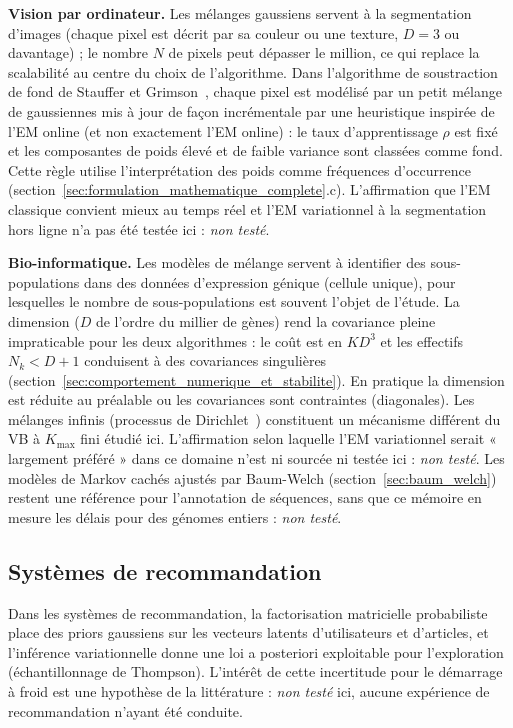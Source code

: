 \textbf{Vision par ordinateur. }Les mélanges gaussiens servent à la segmentation d'images (chaque pixel est décrit par sa couleur ou une texture, $D=3$ ou davantage) ; le nombre $N$ de pixels peut dépasser le million, ce qui replace la scalabilité au centre du choix de l'algorithme. Dans l'algorithme de soustraction de fond de Stauffer et Grimson~\cite{stauffer1999}, chaque pixel est modélisé par un petit mélange de gaussiennes mis à jour de façon incrémentale par une heuristique inspirée de l'EM online (et non exactement l'EM online) : le taux d'apprentissage $\rho$ est fixé et les composantes de poids élevé et de faible variance sont classées comme fond. Cette règle utilise l'interprétation des poids comme fréquences d'occurrence (section~\ref{sec:formulation_mathematique_complete}.c). L'affirmation que l'EM classique convient mieux au temps réel et l'EM variationnel à la segmentation hors ligne n'a pas été testée ici : \emph{non testé}.

\textbf{Bio-informatique. }Les modèles de mélange servent à identifier des sous-populations dans des données d'expression génique (cellule unique), pour lesquelles le nombre de sous-populations est souvent l'objet de l'étude. La dimension ($D$ de l'ordre du millier de gènes) rend la covariance pleine impraticable pour les deux algorithmes : le coût est en $KD^3$ et les effectifs $N_k < D+1$ conduisent à des covariances singulières (section~\ref{sec:comportement_numerique_et_stabilite}). En pratique la dimension est réduite au préalable ou les covariances sont contraintes (diagonales). Les mélanges infinis (processus de Dirichlet~\cite{rasmussen2000}) constituent un mécanisme différent du VB à $K_{\max}$ fini étudié ici. L'affirmation selon laquelle l'EM variationnel serait « largement préféré » dans ce domaine n'est ni sourcée ni testée ici : \emph{non testé}. Les modèles de Markov cachés ajustés par Baum-Welch (section~\ref{sec:baum_welch}) restent une référence pour l'annotation de séquences, sans que ce mémoire en mesure les délais pour des génomes entiers : \emph{non testé}.


\subsection{Systèmes de recommandation}\label{sec:systemes_de_recommandation_revue_de}
Dans les systèmes de recommandation, la factorisation matricielle probabiliste place des priors gaussiens sur les vecteurs latents d'utilisateurs et d'articles, et l'inférence variationnelle donne une loi a posteriori exploitable pour l'exploration (échantillonnage de Thompson). L'intérêt de cette incertitude pour le démarrage à froid est une hypothèse de la littérature : \emph{non testé} ici, aucune expérience de recommandation n'ayant été conduite.


